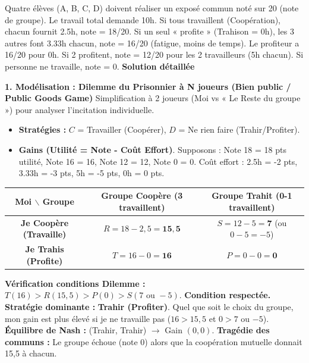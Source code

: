 \documentclass[11pt]{article}
\begin{document}
\begin{exoresolu}
Quatre élèves (A, B, C, D) doivent réaliser un exposé commun noté sur 20 (note de groupe). Le travail total demande 10h. Si tous travaillent (Coopération), chacun fournit 2.5h, note = 18/20. Si un seul « profite » (Trahison = 0h), les 3 autres font 3.33h chacun, note = 16/20 (fatigue, moins de temps). Le profiteur a 16/20 pour 0h. Si 2 profitent, note = 12/20 pour les 2 travailleurs (5h chacun). Si personne ne travaille, note = 0.
\tcblower
\textbf{Solution détaillée}

\textbf{1. Modélisation : Dilemme du Prisonnier à N joueurs (Bien public / Public Goods Game)}
Simplification à 2 joueurs (Moi vs « Le Reste du groupe ») pour analyser l'incitation individuelle.
\begin{itemize}
    \item \textbf{Stratégies :} $C$ = Travailler (Coopérer), $D$ = Ne rien faire (Trahir/Profiter).
    \item \textbf{Gains (Utilité = Note - Coût Effort)}. Supposons : Note 18 = 18 pts utilité, Note 16 = 16, Note 12 = 12, Note 0 = 0. Coût effort : 2.5h = -2 pts, 3.33h = -3 pts, 5h = -5 pts, 0h = 0 pts.
\end{itemize}

\begin{center}
\begin{tabular}{|c|c|c|}\hline
\textbf{Moi $\backslash$ Groupe} & \textbf{Groupe Coopère (3 travaillent)} & \textbf{Groupe Trahit (0-1 travaillent)} \\ \hline
\textbf{Je Coopère (Travaille)} & $R = 18 - 2,5 = \mathbf{15,5}$ & $S = 12 - 5 = \mathbf{7}$ (ou $0-5=-5$) \\ \hline
\textbf{Je Trahis (Profite)} & $T = 16 - 0 = \mathbf{16}$ & $P = 0 - 0 = \mathbf{0}$ \\ \hline
\end{tabular}
\end{center}

\textbf{Vérification conditions Dilemme :} $T(16) > R(15,5) > P(0) > S(7 \text{ ou } -5)$. \textbf{Condition respectée.}
\textbf{Stratégie dominante :} \textbf{Trahir (Profiter)}. Quel que soit le choix du groupe, mon gain est plus élevé si je ne travaille pas ($16 > 15,5$ et $0 > 7$ ou $-5$).
\textbf{Équilibre de Nash :} (Trahir, Trahir) $\to$ Gain $(0, 0)$. \textbf{Tragédie des communs :} Le groupe échoue (note 0) alors que la coopération mutuelle donnait 15,5 à chacun.


\end{exoresolu}
\end{document}
